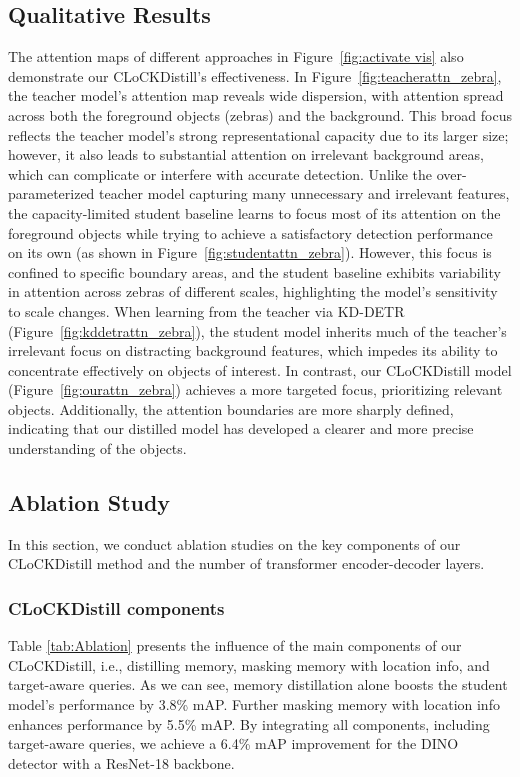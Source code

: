 \subsection{Qualitative Results}
The attention maps of different approaches in Figure~\ref{fig:activate vis} also demonstrate our CLoCKDistill's effectiveness. In Figure~\ref{fig:teacherattn_zebra}, the teacher model's attention map reveals wide dispersion, with attention spread across both the foreground objects (zebras) and the background. This broad focus reflects the teacher model's strong representational capacity due to its larger size; however, it also leads to substantial attention on irrelevant background areas, which can complicate or interfere with accurate detection.
Unlike the over-parameterized teacher model capturing many unnecessary and irrelevant features, the capacity-limited student baseline learns to focus most of its attention on the foreground objects while trying to achieve a satisfactory detection performance on its own (as shown in Figure~\ref{fig:studentattn_zebra}). However, this focus is confined to specific boundary areas, and the student baseline exhibits variability in attention across zebras of different scales, highlighting the model's sensitivity to scale changes.
When learning from the teacher via KD-DETR (Figure~\ref{fig:kddetrattn_zebra}), the student model inherits much of the teacher’s irrelevant focus on distracting background features, which impedes its ability to concentrate effectively on objects of interest.
In contrast, our CLoCKDistill model (Figure~\ref{fig:ourattn_zebra}) achieves a more targeted focus, prioritizing relevant objects. Additionally, the attention boundaries are more sharply defined, indicating that our distilled model has developed a clearer and more precise understanding of the objects.


\subsection{Ablation Study}
In this section, we conduct ablation studies on the key components of our CLoCKDistill method and the number of transformer encoder-decoder layers.
\subsubsection{CLoCKDistill components}
Table \ref{tab:Ablation} presents the influence of the main components of our CLoCKDistill, i.e., distilling memory, masking memory with location info, and target-aware queries. As we can see, memory distillation alone boosts the student model's performance by 3.8\% mAP. Further masking memory with location info enhances performance by 5.5\% mAP. By integrating all components, including target-aware queries, we achieve a 6.4\% mAP improvement for the DINO detector with a ResNet-18 backbone.


